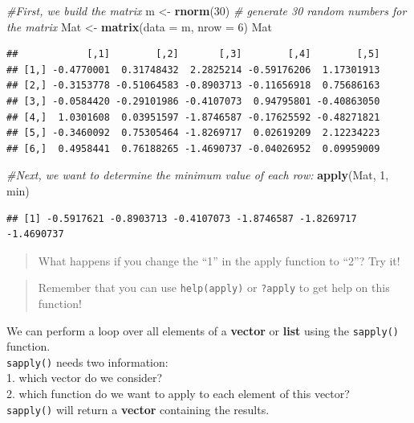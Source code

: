 \documentclass[
]{book}
\newenvironment{Shaded}{\begin{snugshade}}{\end{snugshade}}
\newcommand{\AttributeTok}[1]{\textcolor[rgb]{0.13,0.29,0.53}{#1}}
\newcommand{\CommentTok}[1]{\textcolor[rgb]{0.56,0.35,0.01}{\textit{#1}}}
\newcommand{\DecValTok}[1]{\textcolor[rgb]{0.00,0.00,0.81}{#1}}
\newcommand{\FunctionTok}[1]{\textcolor[rgb]{0.13,0.29,0.53}{\textbf{#1}}}
\newcommand{\NormalTok}[1]{#1}
\newcommand{\OtherTok}[1]{\textcolor[rgb]{0.56,0.35,0.01}{#1}}
\begin{document}
\begin{Shaded}
\begin{Highlighting}[]
\CommentTok{\#First, we build the matrix }
\NormalTok{m }\OtherTok{\textless{}{-}} \FunctionTok{rnorm}\NormalTok{(}\DecValTok{30}\NormalTok{)   }\CommentTok{\# generate 30 random numbers for the matrix}
\NormalTok{Mat }\OtherTok{\textless{}{-}} \FunctionTok{matrix}\NormalTok{(}\AttributeTok{data =}\NormalTok{ m, }\AttributeTok{nrow =} \DecValTok{6}\NormalTok{)}
\NormalTok{Mat}
\end{Highlighting}
\end{Shaded}

\begin{verbatim}
##            [,1]        [,2]       [,3]        [,4]        [,5]
## [1,] -0.4770001  0.31748432  2.2825214 -0.59176206  1.17301913
## [2,] -0.3153778 -0.51064583 -0.8903713 -0.11656918  0.75686163
## [3,] -0.0584420 -0.29101986 -0.4107073  0.94795801 -0.40863050
## [4,]  1.0301608  0.03951597 -1.8746587 -0.17625592 -0.48271821
## [5,] -0.3460092  0.75305464 -1.8269717  0.02619209  2.12234223
## [6,]  0.4958441  0.76188265 -1.4690737 -0.04026952  0.09959009
\end{verbatim}

\begin{Shaded}
\begin{Highlighting}[]
\CommentTok{\#Next, we want to determine the minimum value of each row: }
\FunctionTok{apply}\NormalTok{(Mat, }\DecValTok{1}\NormalTok{, min)}
\end{Highlighting}
\end{Shaded}

\begin{verbatim}
## [1] -0.5917621 -0.8903713 -0.4107073 -1.8746587 -1.8269717 -1.4690737
\end{verbatim}

\begin{quote}
What happens if you change the ``1'' in the apply function to ``2''?
Try it!
\end{quote}

\begin{quote}
Remember that you can use \texttt{help(apply)} or \texttt{?apply} to get help on this function!
\end{quote}

We can perform a loop over all elements of a \textbf{vector} or \textbf{list} using the \texttt{sapply()} function.\\
\texttt{sapply()} needs two information:\\
1.
which vector do we consider?\\
2.
which function do we want to apply to each element of this vector?\\
\texttt{sapply()} will return a \textbf{vector} containing the results.
\end{document}
